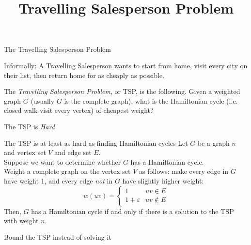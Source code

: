 \documentclass{beamer}
\title{Travelling Salesperson Problem}
\begin{document}
\begin{frame}{The Travelling Salesperson Problem}
\begin{block}{Informally:}
  A Travelling Salesperson wants to start from home, visit every city on their list, then return home for as cheaply as possible.
\end{block}

\begin{definition}
The \emph{Travelling Salesperson Problem}, or TSP, is the following.  Given a weighted graph $G$ (usually $G$ is the complete graph), what is the Hamiltonian cycle (i.e. closed walk visit every vertex) of cheapest weight?
  \end{definition}

\begin{block}{The TSP is \emph{Hard}}
  \end{block}

\end{frame}

\begin{frame}{The TSP is at least as hard as finding Hamiltonian cycles}
  Let $G$ be a graph $n$ and vertex set $V$ and edge set $E$. \\
  Suppose we want to determine whether $G$ has a Hamiltonian cycle.\\
Weight a complete graph on the vertex set $V$ as follows: make every edge in $G$ have weight 1, and every edge \emph{not} in $G$ have slightly higher weight:
  $$w(uv)=\begin{cases} 1 & uv \in E \\
1+\varepsilon & uv\notin E\end{cases} $$
Then, $G$ has a Hamiltonian cycle if and only if there is a solution to the TSP with weight $n$.

\begin{block}{Bound the TSP instead of solving it}
  \end{block}
\end{frame}
\end{document}
